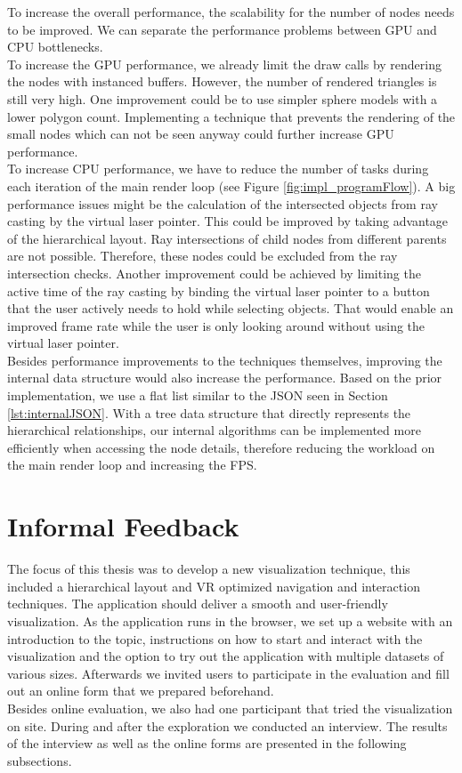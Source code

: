 To increase the overall performance, the scalability for the number of nodes needs to be improved. We can separate the performance problems between GPU and CPU bottlenecks.
\\
To increase the GPU performance, we already limit the draw calls by rendering the nodes with instanced buffers.
However, the number of rendered triangles is still very high. 
One improvement could be to use simpler sphere models with a lower polygon count. Implementing a technique that prevents the rendering of the small nodes which can not be seen anyway could further increase GPU performance.
\\
To increase CPU performance, we have to reduce the number of tasks during each iteration of the main render loop (see Figure \ref{fig:impl_programFlow}).
A big performance issues might be the calculation of the intersected objects from ray casting by the virtual laser pointer. This could be improved by taking advantage of the hierarchical layout.
Ray intersections of child nodes from different parents are not possible. Therefore, these nodes could be excluded from the ray intersection checks. 
Another improvement could be achieved by limiting the active time of the ray casting by binding the virtual laser pointer to a button that the user actively needs to hold while selecting objects. 
That would enable an improved frame rate while the user is only looking around without using the virtual laser pointer.
\\
Besides performance improvements to the techniques themselves, improving the internal data structure would also increase the performance. Based on the prior implementation, we use a flat list similar to the JSON seen in Section \ref{lst:internalJSON}. With a tree data structure that directly represents the hierarchical relationships, our internal algorithms can be implemented more efficiently when accessing the node details, therefore reducing the workload on the main render loop and increasing the FPS.

\section{Informal Feedback}
\label{sec:informalFeedback}

The focus of this thesis was to develop a new visualization technique, this included a hierarchical layout and VR optimized navigation and interaction techniques.
The application should deliver a smooth and user-friendly visualization.
As the application runs in the browser, we set up a website \cite{thesisWebsite} with an introduction to the topic, instructions on how to start and interact with the visualization and the option to try out the application with multiple datasets of various sizes. Afterwards we invited users to participate in the evaluation and fill out an online form that we prepared beforehand.
\\
Besides online evaluation, we also had one participant that tried the visualization on site. During and after the exploration we conducted an interview.
The results of the interview as well as the online forms are presented in the following subsections.

